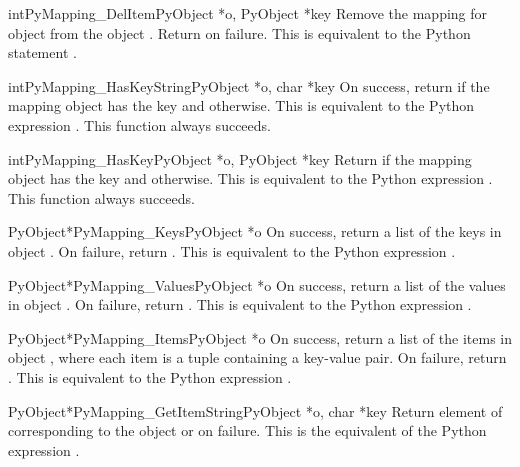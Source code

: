 \documentclass{manual}
\begin{document}
\begin{cfuncdesc}{int}{PyMapping_DelItem}{PyObject *o, PyObject *key}
Remove the mapping for object  from the object .
Return  on failure.  This is equivalent to
the Python statement .
\end{cfuncdesc}


\begin{cfuncdesc}{int}{PyMapping_HasKeyString}{PyObject *o, char *key}
On success, return  if the mapping object has the key
 and  otherwise.  This is equivalent to the Python
expression . 
This function always succeeds.
\end{cfuncdesc}


\begin{cfuncdesc}{int}{PyMapping_HasKey}{PyObject *o, PyObject *key}
Return  if the mapping object has the key  and
 otherwise.  This is equivalent to the Python expression
. 
This function always succeeds.
\end{cfuncdesc}


\begin{cfuncdesc}{PyObject*}{PyMapping_Keys}{PyObject *o}
On success, return a list of the keys in object .  On
failure, return \NULL{}. This is equivalent to the Python
expression .
\end{cfuncdesc}


\begin{cfuncdesc}{PyObject*}{PyMapping_Values}{PyObject *o}
On success, return a list of the values in object .  On
failure, return \NULL{}. This is equivalent to the Python
expression .
\end{cfuncdesc}


\begin{cfuncdesc}{PyObject*}{PyMapping_Items}{PyObject *o}
On success, return a list of the items in object , where
each item is a tuple containing a key-value pair.  On
failure, return \NULL{}. This is equivalent to the Python
expression .
\end{cfuncdesc}


\begin{cfuncdesc}{PyObject*}{PyMapping_GetItemString}{PyObject *o, char *key}
Return element of  corresponding to the object  or
\NULL{} on failure. This is the equivalent of the Python expression
.
\end{cfuncdesc}
\end{document}

